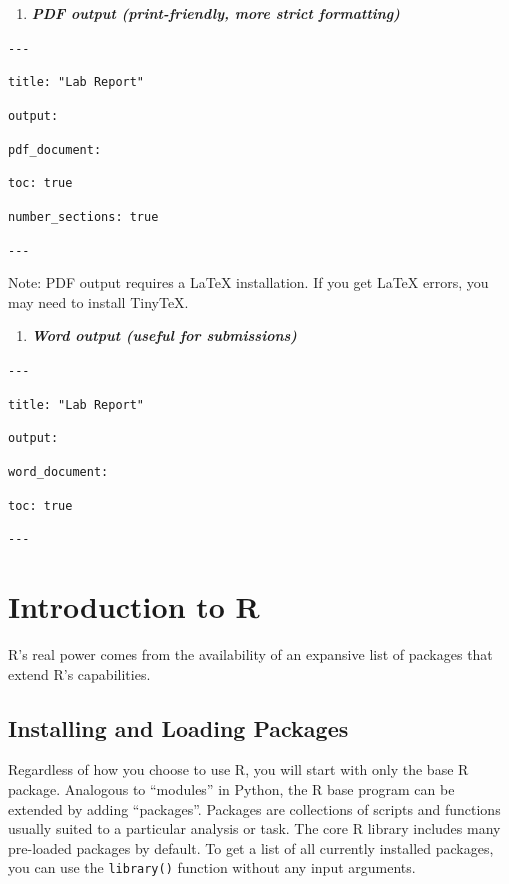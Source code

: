 \documentclass[
  11pt,
]{article}
\providecommand{\tightlist}{%
  \setlength{\itemsep}{0pt}\setlength{\parskip}{0pt}}
\begin{document}
\begin{enumerate}
\def\labelenumi{\arabic{enumi}.}
\setcounter{enumi}{1}
\tightlist
\item
  \textbf{\emph{PDF output (print-friendly, more strict formatting)}}
\end{enumerate}

\texttt{-\/-\/-}

\texttt{title:\ "Lab\ Report"}

\texttt{output:}

\texttt{pdf\_document:}

\texttt{toc:\ true}

\texttt{number\_sections:\ true}

\texttt{-\/-\/-}

Note: PDF output requires a LaTeX installation. If you get LaTeX errors,
you may need to install TinyTeX.

\begin{enumerate}
\def\labelenumi{\arabic{enumi}.}
\setcounter{enumi}{2}
\tightlist
\item
  \textbf{\emph{Word output (useful for submissions)}}
\end{enumerate}

\texttt{-\/-\/-}

\texttt{title:\ "Lab\ Report"}

\texttt{output:}

\texttt{word\_document:}

\texttt{toc:\ true}

\texttt{-\/-\/-}

\section{Introduction to R}\label{introduction-to-r}

R's real power comes from the availability of an expansive list of
packages that extend R's capabilities.

\subsection{Installing and Loading
Packages}\label{installing-and-loading-packages}

Regardless of how you choose to use R, you will start with only the base
R package. Analogous to ``modules'' in Python, the R base program can be
extended by adding ``packages''. Packages are collections of scripts and
functions usually suited to a particular analysis or task. The core R
library includes many pre-loaded packages by default. To get a list of
all currently installed packages, you can use the \texttt{library()}
function without any input arguments.
\end{document}
